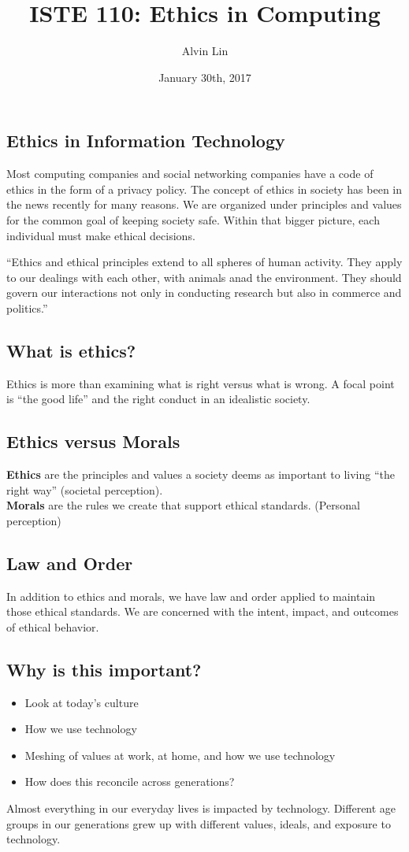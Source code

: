 \documentclass[letterpaper, 12pt]{article}
\title{ISTE 110: Ethics in Computing}
\author{Alvin Lin}
\date{January 30th, 2017}
\begin{document}
\maketitle

\subsection*{Ethics in Information Technology}
Most computing companies and social networking companies have a code of ethics
in the form of a privacy policy. The concept of ethics in society has been
in the news recently for many reasons. We are organized under principles and
values for the common goal of keeping society safe. Within that bigger picture,
each individual must make ethical decisions. \par
``Ethics and ethical principles extend to all spheres of human activity. They
apply to our dealings with each other, with animals anad the environment. They
should govern our interactions not only in conducting research but also in
commerce and politics.''

\subsection*{What is ethics?}
Ethics is more than examining what is right versus what is wrong. A focal point
is ``the good life'' and the right conduct in an idealistic society.

\subsection*{Ethics versus Morals}
\textbf{Ethics} are the principles and values a society deems as important to
living ``the right way'' (societal perception). \\
\textbf{Morals} are the rules we create that support ethical standards.
(Personal perception)

\subsection*{Law and Order}
In addition to ethics and morals, we have law and order applied to maintain
those ethical standards. We are concerned with the intent, impact, and outcomes
of ethical behavior.

\subsection*{Why is this important?}
\begin{itemize}
  \item Look at today's culture
  \item How we use technology
  \item Meshing of values at work, at home, and how we use technology
  \item How does this reconcile across generations?
\end{itemize}
Almost everything in our everyday lives is impacted by technology. Different
age groups in our generations grew up with different values, ideals, and
exposure to technology.
\end{document}
